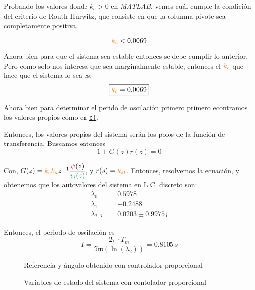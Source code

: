 Probando los valores donde \( k_c > 0 \) en \textit{MATLAB}, vemos cuál cumple la condición del criterio de Routh-Hurwitz, que consiste en que la columna pivote sea completamente positiva.

\begin{equation}
    \nara{k_{c}}  < 0.0069
\end{equation}

Ahora bien para que el sistema sea estable entonces se debe cumplir lo anterior. Pero 
como solo nos interesa que sea marginalmente estable, entonces el $\nara{k_{c}}$
que hace que el sistema lo sea es:
\begin{equation}
    \boxed{\nara{k_c} = 0.0069}
\end{equation}

Ahora bien para determinar el perido de oscilación primero primero econtramos los valores propios como en  \hyperref[pregunta-c]{\texttt{c)}}.

Entonces, los valores propios del sistema serán los polos de la función de
transferencia. Buscamos entonces
\begin{equation}
  1 + G(z)r(z) = 0
\end{equation}

Con, $G(z) =  \nara{k_{c} k_{a}} z^{-1} \dfrac{\rojo{\psi}(z)}{\verd{v_{i}(z)}}$, y
$r(s) = \nara{k_{st}}$. Entonces, resolvemos la ecuación, y obtenemos que los
autovalores del sistema en L.C. discreto son:
\begin{align*}
  \lambda_{0} &= 0.5978\\
  \lambda_{1} &= -0.2488\\
  \lambda_{2,3} &= 0.0203 \pm 0.9975j
\end{align*}

Entonces, el periodo de oscilación es
\begin{equation}
    T = \frac{2\pi \cdot T_{m}}{\mathfrak{Im}(\ln(\lambda_{2}))} = 0.8105\ \unit{s} 
\end{equation}

\begin{figure}[h]
    \centering
    
    \caption{Referencia y ángulo obtenido con controlador proporcional}\label{fig:psi-prop-disc-marge}
\end{figure}

\begin{figure}[h]
  \centering
  
  \caption{Variables de estado del sistema con contolador proporcional}\label{fig:estado-prop-disc-marge}
\end{figure}

